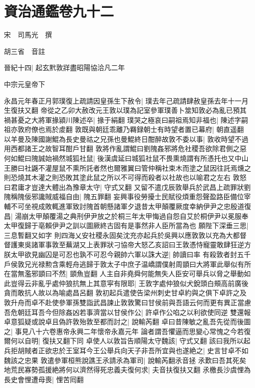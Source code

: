 \chapter{資治通鑑卷九十二}
宋　司馬光　撰

胡三省　音註

晉紀十四|{
	起玄黓敦牂盡昭陽協洽凡二年}


中宗元皇帝下

永昌元年春正月郭璞復上疏請因皇孫生下赦令|{
	璞去年己疏請肆赦皇孫去年十一月生復扶又翻}
帝從之乙卯大赦改元王敦以璞為記室參軍璞善卜筮知敦必為亂已預其禍甚憂之大將軍掾潁川陳述卒|{
	掾于絹翻}
璞哭之極哀曰嗣祖焉知非福也|{
	陳述字嗣祖亦敦府僚也焉於䖍翻}
敦既與朝廷乖離乃羇録朝士有時望者置已幕府|{
	朝直遥翻}
以羊曼及陳國謝鯤為長史曼祜之兄孫也曼鯤終日酣醉故敦不委以事|{
	敦收時望不過用西都諸王之故智耳酣戶甘翻}
敦將作亂謂鯤曰劉隗姦邪將危社稷吾欲除君側之惡何如鯤曰隗誠始禍然城狐社鼠|{
	後漢虞延曰城狐社鼠不畏熏燒謂有所憑托也又中山王勝曰社鼷不灌屋鼠不熏所託者然也爾雅翼曰管仲稱社束木而塗之鼠因往託焉燻之則恐燒其木灌之則恐敗其塗此鼠之所以不可得而殺者以社故也以喻君之左右}
敦怒曰君庸才豈達大體出為豫章太守|{
	守式又翻}
又留不遣戊辰敦舉兵於武昌上疏罪狀劉隗稱隗佞邪讒賊威福自由|{
	隗五罪翻}
妄興事役勞擾士民賦役煩重怨聲盈路臣備位宰輔不可坐視成敗輒進軍致討隗首朝懸諸軍夕退昔太甲顛覆厥度幸納伊尹之忠殷道復昌|{
	湯崩太甲顛覆湯之典刑伊尹放之於桐三年太甲悔過自怨自艾於桐伊尹以冕服奉太甲復歸于亳賴伊尹之訓以圖厥終古固有是事然非人臣所當為也}
願陛下深垂三思|{
	三息暫翻又如字}
則四海乂安社稷永固矣沈充亦起兵於吳興以應敦敦以充為大都督督護東吳諸軍事敦至蕪湖又上表罪狀刁協帝大怒乙亥詔曰王敦憑恃寵靈敢肆狂逆方朕太甲欲見幽囚是可忍也孰不可忍今親帥六軍以誅大逆|{
	帥讀曰率}
有殺敦者封五千戶侯敦兄光禄勲含乘輕舟逃歸于敦太子中庶子温嶠謂僕射周顗曰大將軍此舉似有所在當無濫邪顗曰不然|{
	顗魚豈翻}
人主自非堯舜何能無失人臣安可舉兵以脅之舉動如此豈得云非亂乎處仲狼抗無上其意寜有限耶|{
	王敦字處仲狼似犬銳頭白頰高前廣後貪而敢抗人故以為喻處昌呂翻}
敦初起兵遣使告梁州刺史甘卓約與之俱下卓許之及敦升舟而卓不赴使參軍孫雙詣武昌諫止敦敦驚曰甘侯前與吾語云何而更有異正當慮吾危朝廷耳吾今但除姦凶若事濟當以甘侯作公|{
	許卓作公啗之以利欲使同逆}
雙還報卓意狐疑或說卓且偽許敦殆敦至都而討之|{
	說輸芮翻}
卓曰昔陳敏之亂吾先從而後圖之|{
	事見八十六卷惠帝永興二年懷帝永嘉元年}
論者謂吾懼逼而思變心常愧之今若復爾何以自明|{
	復扶又翻下同}
卓使人以敦旨告順陽太守魏該|{
	守式又翻}
該曰我所以起兵拒胡賊者正欲忠於王室耳今王公舉兵向天子非吾所宜與也遂絶之|{
	史言甘卓不如魏該之忠果}
敦遣參軍桓熊說譙王氶請氶為軍司|{
	說輸芮翻氶音拯}
氶歎曰吾其死矣地荒民寡勢孤援絶將何以濟然得死忠義夫復何求|{
	夫音扶復扶又翻}
氶檄長沙虞悝為長史會悝遭母喪|{
	悝苦囘翻}
